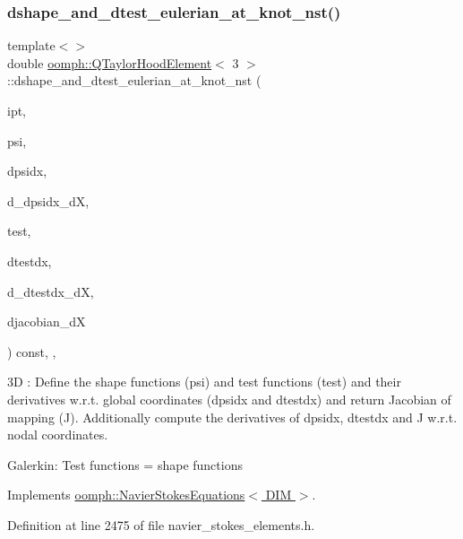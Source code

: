 \subsubsection{\texorpdfstring{dshape\+\_\+and\+\_\+dtest\+\_\+eulerian\+\_\+at\+\_\+knot\+\_\+nst()}{dshape\_and\_dtest\_eulerian\_at\_knot\_nst()}\hspace{0.1cm}{\footnotesize\ttfamily [4/4]}}
{\footnotesize\ttfamily template$<$$>$ \\
double \hyperlink{classoomph_1_1QTaylorHoodElement}{oomph\+::\+Q\+Taylor\+Hood\+Element}$<$ 3 $>$\+::dshape\+\_\+and\+\_\+dtest\+\_\+eulerian\+\_\+at\+\_\+knot\+\_\+nst (\begin{DoxyParamCaption}\item[{const unsigned \&}]{ipt,  }\item[{\hyperlink{classoomph_1_1Shape}{Shape} \&}]{psi,  }\item[{\hyperlink{classoomph_1_1DShape}{D\+Shape} \&}]{dpsidx,  }\item[{\hyperlink{classoomph_1_1RankFourTensor}{Rank\+Four\+Tensor}$<$ double $>$ \&}]{d\+\_\+dpsidx\+\_\+dX,  }\item[{\hyperlink{classoomph_1_1Shape}{Shape} \&}]{test,  }\item[{\hyperlink{classoomph_1_1DShape}{D\+Shape} \&}]{dtestdx,  }\item[{\hyperlink{classoomph_1_1RankFourTensor}{Rank\+Four\+Tensor}$<$ double $>$ \&}]{d\+\_\+dtestdx\+\_\+dX,  }\item[{\hyperlink{classoomph_1_1DenseMatrix}{Dense\+Matrix}$<$ double $>$ \&}]{djacobian\+\_\+dX }\end{DoxyParamCaption}) const\hspace{0.3cm}{\ttfamily [inline]}, {\ttfamily [protected]}, {\ttfamily [virtual]}}

3D \+: Define the shape functions (psi) and test functions (test) and their derivatives w.\+r.\+t. global coordinates (dpsidx and dtestdx) and return Jacobian of mapping (J). Additionally compute the derivatives of dpsidx, dtestdx and J w.\+r.\+t. nodal coordinates.

Galerkin\+: Test functions = shape functions 

Implements \hyperlink{classoomph_1_1NavierStokesEquations_afbc63afd804f5143c74b0ca1be76ef82}{oomph\+::\+Navier\+Stokes\+Equations$<$ D\+I\+M $>$}.



Definition at line 2475 of file navier\+\_\+stokes\+\_\+elements.\+h.



